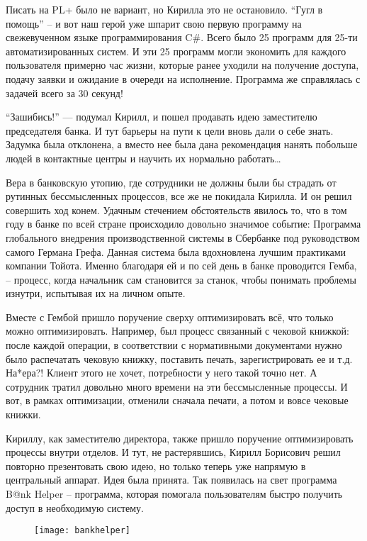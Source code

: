 \documentclass[../index.tex]{subfiles}
\begin{document}
Писать на PL+ было не вариант, но Кирилла это не остановило. “Гугл в помощь” -- и вот наш герой уже шпарит свою первую программу на свежевученном языке программирования C\#. Всего было 25 программ для 25-ти автоматизированных систем. И эти 25 программ могли экономить для каждого пользователя примерно час жизни, которые ранее уходили на получение доступа, подачу заявки и ожидание в очереди на исполнение. Программа же справлялась с задачей всего за 30 секунд! 


“Зашибись!” — подумал Кирилл, и пошел продавать идею заместителю председателя банка. И тут барьеры на пути к цели вновь дали о себе знать. Задумка была отклонена, а вместо нее была дана рекомендация нанять побольше людей в контактные центры и научить их нормально работать… 


Вера в банковскую утопию, где сотрудники не должны были бы страдать от рутинных бессмысленных процессов, все же не покидала Кирилла. И он решил совершить ход конем. Удачным стечением обстоятельств явилось то, что в том году в банке по всей стране происходило довольно значимое событие: Программа глобального внедрения производственной системы в Сбербанке под руководством самого Германа Грефа. Данная система была вдохновлена лучшим практиками компании Тойота. Именно благодаря ей и по сей день в банке проводится Гемба, -- процесс, когда начальник сам становится за станок, чтобы понимать проблемы изнутри, испытывая их на личном опыте.


Вместе с Гембой пришло поручение сверху оптимизировать всё, что только можно оптимизировать. Например, был процесс связанный с чековой книжкой: после каждой операции, в соответствии с нормативными документами нужно было распечатать чековую книжку, поставить печать, зарегистрировать ее и т.д. На*ера?! Клиент этого не хочет, потребности у него такой точно нет. А сотрудник тратил довольно много времени на эти бессмысленные процессы.  И вот, в рамках оптимизации, отменили сначала печати, а потом и вовсе чековые книжки.


Кириллу, как заместителю директора, также пришло поручение оптимизировать процессы внутри отделов. И тут, не растерявшись, Кирилл Борисович решил повторно презентовать свою идею, но только теперь уже напрямую в центральный аппарат. Идея была принята. Так появилась на свет программа B@nk Helper -- программа, которая помогала пользователям быстро получить доступ в необходимую систему. 

\begin{figure}[h]
\texttt{[image: bankhelper]}
\centering
\end{figure}
\end{document}
